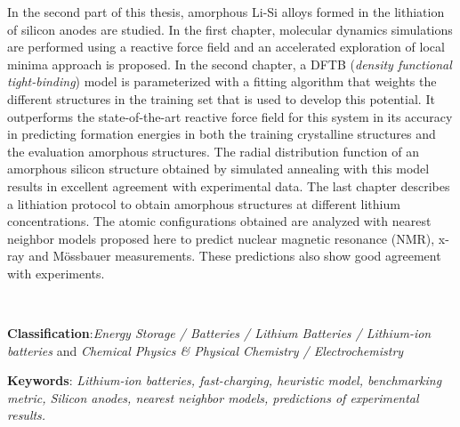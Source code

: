 In the second part of this thesis, amorphous Li-Si alloys formed in the 
lithiation of silicon anodes are studied. In the first chapter, molecular 
dynamics simulations are performed using a reactive force field and an accelerated 
exploration of local minima approach is proposed. In the second chapter, a DFTB 
(\textit{density functional tight-binding}) model is parameterized with a fitting 
algorithm that weights the different structures in the training set that is used to develop this potential. It
outperforms the state-of-the-art reactive force field for this system in its 
accuracy in predicting formation energies in both the training crystalline 
structures and the evaluation amorphous structures. The radial distribution 
function of an amorphous silicon structure obtained by simulated annealing with 
this model results in excellent agreement with experimental data. The last 
chapter describes a lithiation protocol to obtain amorphous structures at 
different lithium concentrations. The atomic configurations obtained are analyzed 
with nearest neighbor models proposed here to predict nuclear magnetic resonance (NMR), x-ray and Mössbauer 
measurements. These predictions also show good agreement with experiments.

\

\textbf{Classification}:\textit{Energy Storage / Batteries / Lithium Batteries / Lithium-ion batteries} and \textit{Chemical Physics \& Physical Chemistry / Electrochemistry}

\textbf{Keywords}: \textit{Lithium-ion batteries, fast-charging, heuristic model, benchmarking metric, Silicon anodes, nearest neighbor models, predictions of experimental results.}
